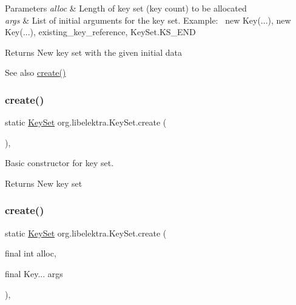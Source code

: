 \begin{DoxyParams}{Parameters}
{\em alloc} & Length of key set (key count) to be allocated \\
\hline
{\em args} & List of initial arguments for the key set. Example\+:~\newline
 new Key(...), new Key(...), existing\+\_\+key\+\_\+reference, Key\+Set.\+K\+S\+\_\+\+E\+ND \\
\hline
\end{DoxyParams}
\begin{DoxyReturn}{Returns}
New key set with the given initial data 
\end{DoxyReturn}
\begin{DoxySeeAlso}{See also}
\mbox{\hyperlink{classorg_1_1libelektra_1_1KeySet_ac0ba4b88bef5e731b586f4ca63b9ab7f}{create()}} 
\end{DoxySeeAlso}
\mbox{\label{classorg_1_1libelektra_1_1KeySet_ac0ba4b88bef5e731b586f4ca63b9ab7f}} 
\subsubsection{\texorpdfstring{create()}{create()}\hspace{0.1cm}{\footnotesize\ttfamily [2/3]}}
{\footnotesize\ttfamily static \mbox{\hyperlink{classorg_1_1libelektra_1_1KeySet}{Key\+Set}} org.\+libelektra.\+Key\+Set.\+create (\begin{DoxyParamCaption}{ }\end{DoxyParamCaption})\hspace{0.3cm}{\ttfamily [inline]}, {\ttfamily [static]}}



Basic constructor for key set. 

\begin{DoxyReturn}{Returns}
New key set 
\end{DoxyReturn}
\mbox{\label{classorg_1_1libelektra_1_1KeySet_a441d0e45a150a6fd5f75be00ec42338d}} 
\subsubsection{\texorpdfstring{create()}{create()}\hspace{0.1cm}{\footnotesize\ttfamily [3/3]}}
{\footnotesize\ttfamily static \mbox{\hyperlink{classorg_1_1libelektra_1_1KeySet}{Key\+Set}} org.\+libelektra.\+Key\+Set.\+create (\begin{DoxyParamCaption}\item[{final int}]{alloc,  }\item[{final Key...}]{args }\end{DoxyParamCaption})\hspace{0.3cm}{\ttfamily [inline]}, {\ttfamily [static]}}



